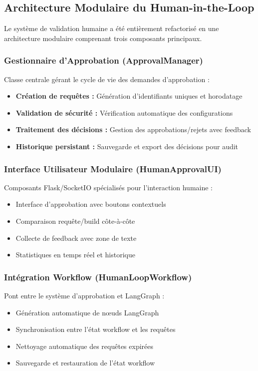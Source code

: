\documentclass[12pt,a4paper]{article}
\begin{document}
\subsection{Architecture Modulaire du Human-in-the-Loop}
Le syst\`eme de validation humaine a \'et\'e enti\`erement refactoris\'e en une architecture modulaire comprenant trois composants principaux.

\subsubsection{Gestionnaire d'Approbation (ApprovalManager)}
Classe centrale g\'erant le cycle de vie des demandes d'approbation :
\begin{itemize}
    \item \textbf{Cr\'eation de requ\^etes :} G\'en\'eration d'identifiants uniques et horodatage
    \item \textbf{Validation de s\'ecurit\'e :} V\'erification automatique des configurations
    \item \textbf{Traitement des d\'ecisions :} Gestion des approbations/rejets avec feedback
    \item \textbf{Historique persistant :} Sauvegarde et export des d\'ecisions pour audit
\end{itemize}

\subsubsection{Interface Utilisateur Modulaire (HumanApprovalUI)}
Composants Flask/SocketIO sp\'ecialis\'es pour l'interaction humaine :
\begin{itemize}
    \item Interface d'approbation avec boutons contextuels
    \item Comparaison requ\^ete/build c\^ote-\`a-c\^ote
    \item Collecte de feedback avec zone de texte
    \item Statistiques en temps r\'eel et historique
\end{itemize}

\subsubsection{Int\'egration Workflow (HumanLoopWorkflow)}
Pont entre le syst\`eme d'approbation et LangGraph :
\begin{itemize}
    \item G\'en\'eration automatique de n\oe uds LangGraph
    \item Synchronisation entre l'\'etat workflow et les requ\^etes
    \item Nettoyage automatique des requ\^etes expir\'ees
    \item Sauvegarde et restauration de l'\'etat workflow
\end{itemize}
\end{document}
